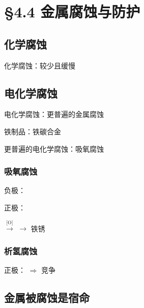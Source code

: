 \section{\S 4.4 金属腐蚀与防护}\label{sect:金属腐蚀与防护}

    \subsection{化学腐蚀}\label{subsec:化学腐蚀}

        化学腐蚀：较少且缓慢




    \subsection{电化学腐蚀}\label{subsec:电化学腐蚀}

        电化学腐蚀：更普遍的金属腐蚀

        铁制品：铁碳合金

        更普遍的电化学腐蚀：吸氧腐蚀

        \subsubsection{吸氧腐蚀}\label{subsubsec:吸氧腐蚀}

            负极：

            正极：

             \(\xrightarrow{\text{[O]}}\)  \(\longrightarrow\)  铁锈

        \subsubsection{析氢腐蚀}\label{subsubsec:析氢腐蚀}

            正极： \(\Rightarrow\) 竞争

    \subsection{金属被腐蚀是宿命}\label{subsec:金属腐蚀宿命}


